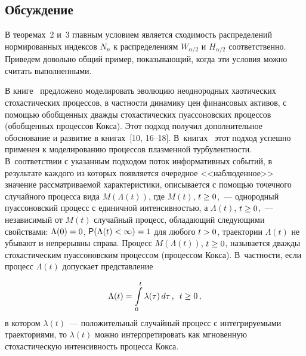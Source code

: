 \begin{multicols}{2}
\vspace*{-3pt}

\section{Обсуждение}

\vspace*{-1pt}

В теоремах~2 и~3 главным условием является сходимость распределений
нормированных индексов $N_n$ к распределениям $W_{\alpha/2}$ и
$H_{\alpha/2}$ соответственно. Приведем довольно общий пример,
по\-ка\-зы\-ва\-ющий, когда эти условия можно считать выполненными.

В книге~\cite{GnedenkoKorolev1996-k} предложено моделировать эволюцию
неоднородных хаотических стохастических процессов, в част\-ности
динамику цен финансовых активов, с помощью обобщенных дважды
стохастических пуассоновских процессов (обобщенных процессов Кокса).
Этот подход получил дополнительное обоснование и развитие в 
книгах~[10, 16--18]. 
В~книгах~\cite{Korolev2011-k, KorolevSkvortsova2006} этот подход успешно
применен к моделированию процессов плазменной турбулентности. 
В~соответствии с указанным подходом поток информативных событий, в
результате каждого из которых появляется очередное <<наблюденное>>
значение рассматриваемой характеристики, описывается с помощью
точечного случайного процесса вида $M(\Lambda(t))$, где $M(t)$,
$t\hm\geq0$,~--- однородный пуассоновский процесс с единичной
интенсивностью, а $\Lambda(t)$, $t\hm\geq0$,~--- независимый от $M(t)$
случайный процесс, обладающий следующими свойствами: $\Lambda(0)\hm=0$,
${\sf P}(\Lambda(t)\hm<\infty)=1$ для любого $t\hm>0$, траектории
$\Lambda(t)$ не убывают и непрерывны справа. Процесс
$M(\Lambda(t))$, $t\hm\geq0$, называется дважды стохастическим
пуассоновским процессом (процессом Кокса). В~част\-ности, если процесс
$\Lambda(t)$ допускает представление

\noindent
$$
\Lambda(t)=\int\limits_{0}^{t}\lambda(\tau)\,d\tau\,,\enskip t\ge0\,,
$$
в котором $\lambda(t)$~--- положительный случайный процесс с
интегрируемыми траекториями, то $\lambda(t)$ можно интерпретировать
как мгновенную стохастическую интенсивность процесса Кокса.


\end{multicols}
